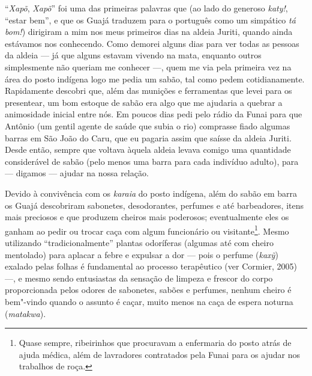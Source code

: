 ``\emph{Xapõ}, \emph{Xapõ}'' foi uma das primeiras palavras que (ao lado
do generoso \emph{katy!}, ``estar bem'', e que os Guajá traduzem para o
português como um simpático \emph{tá} \emph{bom!}) dirigiram a mim nos
meus primeiros dias na aldeia Juriti, quando ainda estávamos nos
conhecendo. Como demorei alguns dias para ver todas as pessoas da aldeia
--- já que alguns estavam vivendo na mata, enquanto outros simplesmente
não queriam me conhecer ---, quem me via pela primeira vez na área do
posto indígena logo me pedia um sabão, tal como pedem cotidianamente.
Rapidamente descobri que, além das munições e ferramentas que levei para
os presentear, um bom estoque de sabão era algo que me ajudaria a
quebrar a animosidade inicial entre nós. Em poucos dias pedi pelo rádio
da Funai para que Antônio (um gentil agente de saúde que subia o rio)
comprasse fiado algumas barras em São João do Caru, que eu pagaria assim
que saísse da aldeia Juriti. Desde então, sempre que voltava àquela
aldeia levava comigo uma quantidade considerável de sabão (pelo menos
uma barra para cada indivíduo adulto), para --- digamos --- ajudar na nossa
relação.

Devido à convivência com os \emph{karaia} do posto indígena, além do
sabão em barra os Guajá descobriram sabonetes, desodorantes, perfumes e
até barbeadores, itens mais preciosos e que produzem cheiros mais
poderosos; eventualmente eles os ganham ao pedir ou trocar caça com
algum funcionário ou visitante\footnote{Quase sempre, ribeirinhos que
  procuravam a enfermaria do posto atrás de ajuda médica, além de
  lavradores contratados pela Funai para os ajudar nos trabalhos de
  roça.}. Mesmo utilizando ``tradicionalmente'' plantas odoríferas
(algumas até com cheiro mentolado) para aplacar a febre e expulsar a dor
--- pois o perfume (\emph{kaxỹ}) exalado pelas folhas é fundamental ao
processo terapêutico (ver Cormier, 2005) ---, e mesmo sendo entusiastas da
sensação de limpeza e frescor do corpo proporcionada pelos odores de
sabonetes, sabões e perfumes, nenhum cheiro é bem"-vindo quando o assunto
é caçar, muito menos na caça de espera noturna (\emph{matakwa}).

